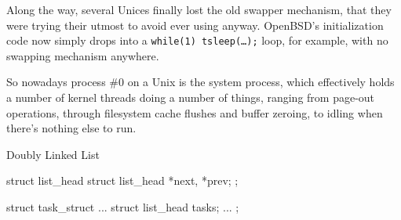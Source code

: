 \begin{description}
  Along the way, several Unices finally lost the old swapper mechanism, that they were
  trying their utmost to avoid ever using anyway. OpenBSD's initialization code now simply
  drops into a \texttt{while(1) tsleep(…);} loop, for example, with no swapping mechanism
  anywhere.

  So nowadays process \#0 on a Unix is the system process, which effectively holds a number
  of kernel threads doing a number of things, ranging from page-out operations, through
  filesystem cache flushes and buffer zeroing, to idling when there's nothing else to run.
\end{description}

\begin{frame}[fragile=singleslide]{Doubly Linked List}
  \begin{center}
  \end{center}
  \begin{minipage}{.5\textwidth}
\begin{ccode}
struct list_head {
    struct list_head *next, *prev;
};
\end{ccode}
  \end{minipage}\hfill
  \begin{minipage}{.4\textwidth}
\begin{ccode}
struct task_struct {
    ...
    struct list_head tasks;
    ...
};
\end{ccode}
  \end{minipage}
\end{frame}

